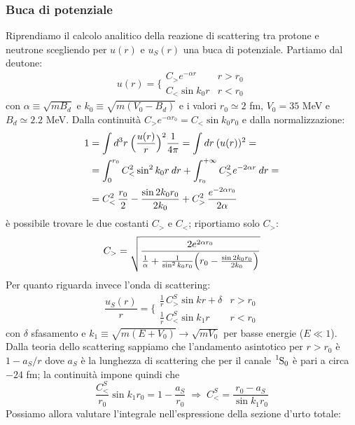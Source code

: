 \subsubsection{Buca di potenziale} Riprendiamo il calcolo analitico della reazione di scattering tra protone e neutrone scegliendo per $u(r)$ e $u_S(r)$ una buca di potenziale. Partiamo dal deutone:
$$u(r) = \Biggl \{%
\begin{array}{ll}
    C_>e^{-\alpha r} & r>r_0  \\
    C_<\sin{k_0r} & r<r_0
\end{array}%
$$
con $\alpha \equiv \sqrt{mB_d}$ e $k_0\equiv \sqrt{m(V_0-B_d)}$ e i valori $r_0\simeq 2$ fm, $V_0 = 35$ MeV e $B_d \simeq 2.2$ MeV. 
Dalla continuità $C_> e^{-\alpha r_0} = C_<\sin{k_0r_0}$ e dalla normalizzazione:
\begin{displaymath}
\begin{aligned}
1 &= \int d^3r\: \Bigl ( \frac{u(r)}{r} \Bigr )^2 \frac{1}{4\pi} = \int dr \: (u(r))^2 = \\
&= \int_0^{r_0} C_<^2\sin^2{k_0r} \: dr + \int_{r_0}^{+\infty} C_>^2 e^{-2\alpha r} \: dr =\\
&= C_<^2 \, \frac{r_0}{2} - \frac{\sin{2k_0r_0}}{2k_0} + C_>^2 \, \frac{e^{-2\alpha r_0}}{2\alpha}
\end{aligned}
\end{displaymath}
è possibile trovare le due costanti $C_>$ e $C_<$; riportiamo solo $C_>$:
$$C_> = \sqrt{\frac{2e^{2\alpha r_0}}{\frac{1}{\alpha} +\frac{1}{\sin^2{k_0r_0}}\Bigl ( r_0-\frac{\sin{2k_0r_0}}{2k_0} \Bigr )}}$$
Per quanto riguarda invece l'onda di scattering:
$$\frac{u_S(r)}{r} = \Biggl \{%
\begin{array}{ll}
   \frac{1}{r}\, C^S_>\sin{kr + \delta} & r>r_0  \\
   \frac{1}{r}\, C^S_<\sin{k_1r} & r<r_0
\end{array}%
$$
con $\delta$ sfasamento e $k_1\equiv\sqrt{m(E+V_0)}\to\sqrt{mV_0}$ per basse energie ($E\ll 1$). Dalla teoria dello scattering sappiamo che l'andamento asintotico per $r>r_0$ è $1-a_S/r$ dove $a_S$ è la lunghezza di scattering che per il canale $\ce{^1S_0}$ è pari a circa $-24$ fm; la continuità impone quindi che 
$$\frac{C^S_{<}}{r_0}\sin{k_1r_0}=1-\frac{a_S}{r_0} \;\Rightarrow\; C^S_{<} = \frac{r_0 - a_S}{\sin{k_1r_0}}$$
Possiamo allora valutare l'integrale nell'espressione della sezione d'urto totale:
